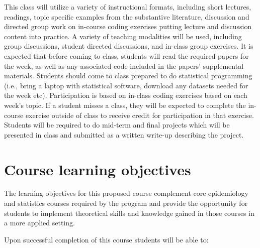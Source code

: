 \documentclass[
]{book}
\begin{document}
This class will utilize a variety of instructional formats, including short lectures, readings, topic specific examples from the substantive literature, discussion and directed group work on in-course coding exercises putting lecture and discussion content into practice. A variety of teaching modalities will be used, including group discussions, student directed discussions, and in-class group exercises. It is expected that before coming to class, students will read the required papers for the week, as well as any associated code included in the papers' supplemental materials. Students should come to class prepared to do statistical programming (i.e., bring a laptop with statistical software, download any datasets needed for the week etc). Participation is based on in-class coding exercises based on each week's topic. If a student misses a class, they will be expected to complete the in-course exercise outside of class to receive credit for participation in that exercise. Students will be required to do mid-term and final projects which will be presented in class and submitted as a written write-up describing the project.

\section{Course learning objectives}\label{course-learning-objectives}

The learning objectives for this proposed course complement core epidemiology
and statistics courses required by the program and provide the opportunity for
students to implement theoretical skills and knowledge gained in those courses
in a more applied setting.

Upon successful completion of this course students will be able to:
\end{document}
